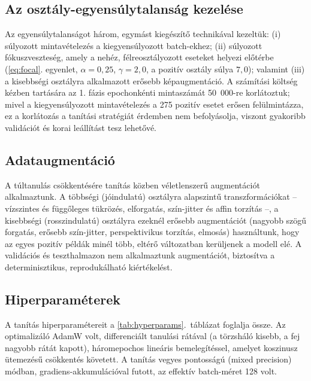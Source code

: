\subsection{Az osztály-egyensúlytalanság kezelése}

Az egyensúlytalanságot három, egymást kiegészítő technikával kezeltük: (i)
súlyozott mintavételezés a kiegyensúlyozott batch-ekhez; (ii) súlyozott
fókuszveszteség, amely a nehéz, félreosztályozott eseteket helyezi előtérbe
(\ref{eq:focal}. egyenlet, $\alpha = 0{,}25$, $\gamma = 2{,}0$, a pozitív
osztály súlya $7{,}0$); valamint (iii) a kisebbségi osztályra alkalmazott
erősebb képaugmentáció. A számítási költség kézben tartására az 1. fázis
epochonkénti mintaszámát 50~000-re korlátoztuk; mivel a kiegyensúlyozott
mintavételezés a 275 pozitív esetet erősen felülmintázza, ez a korlátozás a
tanítási stratégiát érdemben nem befolyásolja, viszont gyakoribb validációt és
korai leállítást tesz lehetővé.

\subsection{Adataugmentáció}

A túltanulás csökkentésére tanítás közben véletlenszerű augmentációt
alkalmaztunk. A többségi (jóindulatú) osztályra alapszintű transzformációkat --
vízszintes és függőleges tükrözés, elforgatás, szín-jitter és affin torzítás --,
a kisebbségi (rosszindulatú) osztályra ezeknél erősebb augmentációt (nagyobb
szögű forgatás, erősebb szín-jitter, perspektivikus torzítás, elmosás)
használtunk, hogy az egyes pozitív példák minél több, eltérő változatban
kerüljenek a modell elé. A validációs és teszthalmazon nem alkalmaztunk
augmentációt, biztosítva a determinisztikus, reprodukálható kiértékelést.

\subsection{Hiperparaméterek}

A tanítás hiperparamétereit a \ref{tab:hyperparams}.~táblázat foglalja össze. Az
optimalizáló AdamW volt, differenciált tanulási rátával (a törzsháló kisebb, a
fej nagyobb rátát kapott), háromepochos lineáris bemelegítéssel, amelyet koszinusz
ütemezésű csökkentés követett. A tanítás vegyes pontosságú (mixed precision)
módban, gradiens-akkumulációval futott, az effektív batch-méret 128 volt.

